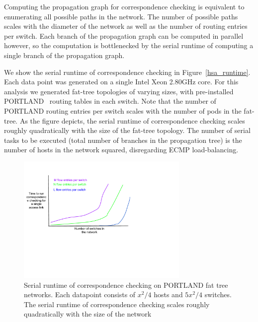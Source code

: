 
 Computing the propagation
graph for correspondence checking is equivalent to enumerating
all possible paths in the network. The number of possible paths scales with the diameter
of the network as well as the number of routing entries per switch.
Each branch of the propagation graph can be
computed in parallel however, so the computation is bottlenecked by the serial runtime
of computing a single branch of the propagation graph.

We show the serial runtime of correspondence checking in 
Figure~\ref{hsa_runtime}. Each data point was generated on a single Intel Xeon
2.80GHz core. For this analysis we generated fat-tree topologies
of varying sizes, with pre-installed PORTLAND~\cite{NiranjanMysore:2009:PSF:1594977.1592575}
routing tables in each switch. Note
that the number of PORTLAND routing entries per switch scales with the number
of pods in the fat-tree. As the figure depicts, the serial runtime of
correspondence checking scales roughly quadratically with the
size of the fat-tree topology. The number of serial tasks to be executed
(total number of branches in the propagation tree) is the number of hosts
in the network squared, disregarding ECMP load-balancing.

\begin{figure}[t]
    \includegraphics[width=3.25in]{../graphs/mock_hsa_overhead.pdf}
    \caption[]{\label{fig:hsa_runtime} Serial runtime of correspondence
    checking on PORTLAND fat tree networks. Each datapoint consists of
    $x^2/4$ hosts and $5x^2/4$ switches. The serial runtime of correspondence
    checking scales roughly quadratically with the size of the network}
\end{figure}

 
